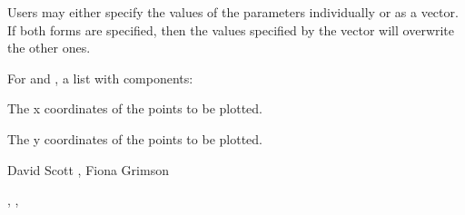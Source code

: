 \documentclass{book}
\begin{document}
\begin{Details}\relax
Users may either specify the values of the parameters individually or
as a vector. If both forms are specified, then the values specified by
the vector  will overwrite the other ones.
\end{Details}
\begin{Value}
For  and , a list with components:
\begin{ldescription}
\item[\code{x}] The x coordinates of the points to be plotted.
\item[\code{y}] The y coordinates of the points to be plotted.
\end{ldescription}
\end{Value}
\begin{Author}\relax
David Scott , Fiona Grimson
\end{Author}
\begin{SeeAlso}\relax
{}, , 
\end{SeeAlso}
\end{document}
